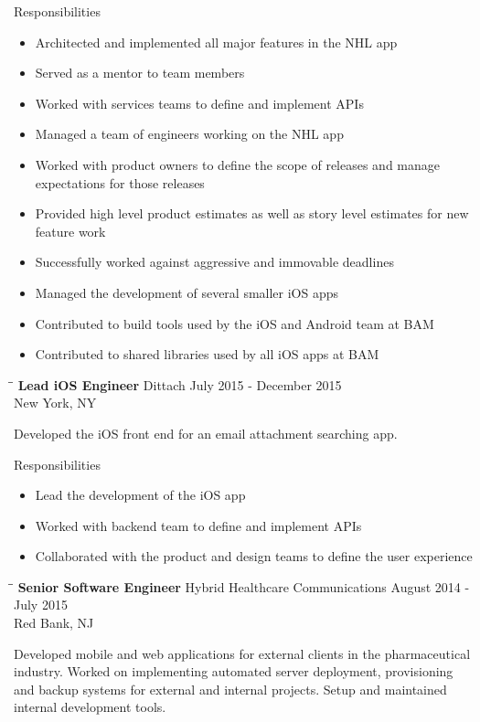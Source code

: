 \documentclass{res}
\begin{document}
\begin{resume}
   Responsibilities
   \begin{itemize}
       \item Architected and implemented all major features in the NHL app
       \item Served as a mentor to team members
       \item Worked with services teams to define and implement APIs
       \item Managed a team of engineers working on the NHL app
       \item Worked with product owners to define the scope of releases and manage expectations for those releases
       \item Provided high level product estimates as well as story level estimates for new feature work
       \item Successfully worked against aggressive and immovable deadlines
       \item Managed the development of several smaller iOS apps
       \item Contributed to build tools used by the iOS and Android team at BAM
       \item Contributed to shared libraries used by all iOS apps at BAM
   \end{itemize}

  \begin{tabbing}
  \hspace{2.3in}\= \hspace{2.6in}\= \kill %
   {\bf Lead iOS Engineer} \>Dittach     \>July 2015 - December 2015\\
                            \>New York, NY
  \end{tabbing}\vspace{-20pt}      %
    Developed the iOS front end for an email attachment searching app.

   Responsibilities
   \begin{itemize}
       \item Lead the development of the iOS app
       \item Worked with backend team to define and implement APIs
       \item Collaborated with the product and design teams to define the user experience
   \end{itemize}
  \newpage
   \begin{tabbing}
   \hspace{2.3in}\= \hspace{2.6in}\= \kill %
    {\bf Senior Software Engineer} \>Hybrid Healthcare Communications     \>August 2014 - July 2015\\
                             \>Red Bank, NJ
   \end{tabbing}\vspace{-20pt}      %
    Developed mobile and web applications for external clients in the pharmaceutical industry.
    Worked on implementing automated server deployment, provisioning and backup systems for external and internal projects.
    Setup and maintained internal development tools.


\end{resume}
\end{document}
